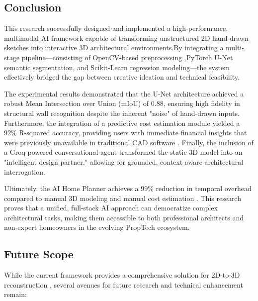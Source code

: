 \documentclass[10pt, conference, a4paper]{IEEEtran}
\begin{document}
\subsection{Conclusion}
This research successfully designed and implemented a high-performance, multimodal AI framework capable of transforming unstructured 2D hand-drawn sketches into interactive 3D architectural environments.By integrating a multi-stage pipeline—consisting of OpenCV-based preprocessing ,PyTorch U-Net semantic segmentation, and Scikit-Learn regression modeling—the system effectively bridged the gap between creative ideation and technical feasibility.

The experimental results demonstrated that the U-Net architecture achieved a robust Mean Intersection over Union (mIoU) of 0.88, ensuring high fidelity in structural wall recognition despite the inherent "noise" of hand-drawn inputs. Furthermore, the integration of a predictive cost estimation module yielded a 92\% R-squared accuracy, providing users with immediate financial insights that were previously unavailable in traditional CAD software . Finally, the inclusion of a Groq-powered conversational agent transformed the static 3D model into an "intelligent design partner," allowing for grounded, context-aware architectural interrogation.

Ultimately, the AI Home Planner achieves a 99\% reduction in temporal overhead compared to manual 3D modeling and manual cost estimation . This research proves that a unified, full-stack AI approach can democratize complex architectural tasks, making them accessible to both professional architects and non-expert homeowners in the evolving PropTech ecosystem.

\subsection{Future Scope}
While the current framework provides a comprehensive solution for 2D-to-3D reconstruction , several avenues for future research and technical enhancement remain:
\end{document}
